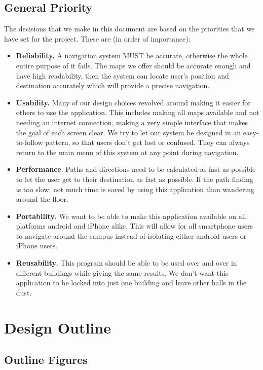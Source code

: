 \documentclass[12pt]{article}
\begin{document}
\subsection{General Priority}
The decisions that we make in this document are based on the priorities that we have set for the
project. These are (in order of importance):
\begin{itemize}

\item \textbf{Reliability.} A navigation system MUST be accurate, otherwise the whole entire purpose of it fails. The maps we offer should be accurate enough and have high readability, then the system can locate user’s position and destination accurately which will provide a precise navigation.
\item \textbf{Usability.} Many of our design choices revolved around making it easier for others to use the application. This includes making all maps available and not needing an internet connection, making a very simple interface that makes the goal of each screen clear. We try to let our system be designed in an easy-to-follow pattern, so that users don’t get lost or confused. They can always return to the main menu of this system at any point during navigation.  
\item \textbf{Performance}. Paths and directions need to be calculated as fast as possible to let the user get to their destination as fast as possible. If the path finding is too slow, not much time is saved by using this application than wandering around the floor.
\item \textbf{Portability}. We want to be able to make this application available on all platforms android and iPhone alike. This will allow for all smartphone users to navigate around the campus instead of isolating either android users or iPhone users.
\item \textbf{Reusability}. This program should be able to be used over and over in different buildings while giving the same results. We don’t want this application to be locked into just one building and leave other halls in the dust. 



\end{itemize}
\section{Design Outline}



\subsection{Outline Figures}
\end{document}
